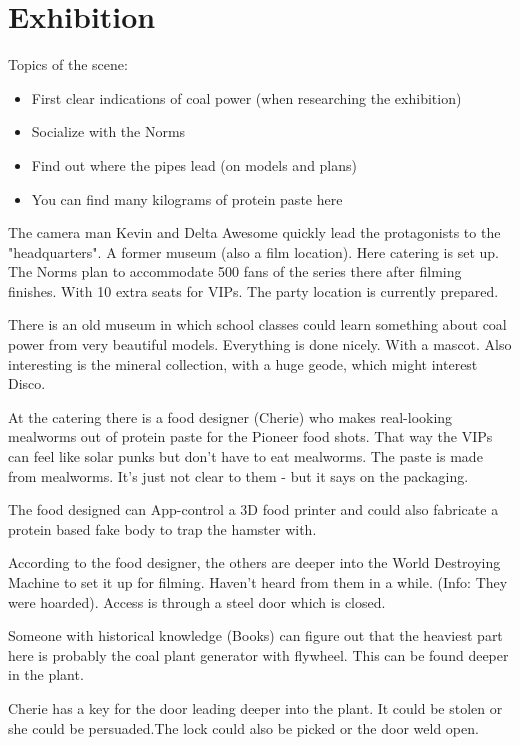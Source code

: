 \section{Exhibition}

Topics of the scene:
\begin{itemize}
\item First clear indications of coal power (when researching the exhibition)
\item Socialize with the Norms
\item Find out where the pipes lead (on models and plans)
\item You can find many kilograms of protein paste here
\end{itemize}


The camera man Kevin and Delta Awesome quickly lead the protagonists to the "headquarters". A former museum (also a film location). Here catering is set up. The Norms plan to accommodate 500 fans of the series there after filming finishes. With 10 extra seats for VIPs. The party location is currently prepared.

There is an old museum in which school classes could learn something about coal power from very beautiful models.
Everything is done nicely. With a mascot. Also interesting is the mineral collection, with a huge geode, which might interest Disco.

At the catering there is a food designer (Cherie) who makes real-looking mealworms out of protein paste for the Pioneer food shots.  That way the VIPs can feel like solar punks but don't have to eat mealworms.
The paste is made from mealworms. It's just not clear to them - but it says on the packaging.

The food designed can App-control a 3D food printer and could also fabricate a protein based fake body to trap the hamster with.

According to the food designer, the others are deeper into the World Destroying Machine to set it up for filming. Haven't heard from them in a while. (Info: They were hoarded). Access is through a steel door which is closed.

Someone with historical knowledge (Books) can figure out that the heaviest part here is probably the coal plant generator with flywheel. This can be found deeper in the plant.

Cherie has a key for the door leading deeper into the plant. It could be stolen or she could be persuaded.The lock could also be picked or the door weld open.


